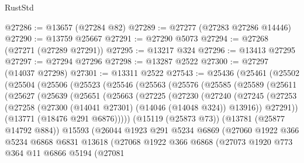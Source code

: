 \begin{lexlean}{RustStd}
\begin{coremodule}
@27286 := @13657 (@27284 @82)
@27289 := @27277 (@27283 @27286 @14446)
@27290 := @13759 @25667
@27291 := @27290 @5073
@27294 := @27268 (@27271 (@27289 @27291))
@27295 := @13217 @324
@27296 := @13413 @27295
@27297 := @27294 @27296
@27298 := @13287 @2522
@27300 := @27297 (@14037 @27298)
@27301 := @13311 @2522
@27543 := @25436
    (@25461
      (@25502
        (@25504
          (@25506
            (@25523
              (@25546
                (@25563
                  (@25576
                    (@25585
                      (@25589
                        (@25611
                          (@25627
                            (@25639
                              (@25651
                                (@25663
                                  (@27225
                                    (@27230
                                      (@27240
                                        (@27245
                                          (@27253
                                            (@27258
                                              (@27300
                                                (@14041 @27301)
                                                (@14046 (@14048 @324))
                                                @13916))
                                            @27291))
                                        (@13771 (@18476 @291 @6876)))))
                                  (@15119 (@25873 @73))
                                  (@13781 (@25877 @14792 @884))
                                  @15593
                                  (@26044
                                    @1923
                                    @291
                                    @5234
                                    @6869
                                    (@27060
                                      @1922
                                      @366
                                      @5234
                                      @6868
                                      @6831
                                      @13618
                                      (@27068
                                        @1922
                                        @366
                                        @6868
                                        (@27073
                                          @1920
                                          @773
                                          @364
                                          @11
                                          @6866
                                          @5194
                                          (@27081

\end{coremodule}
\end{lexlean}
